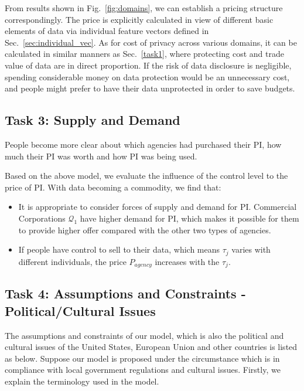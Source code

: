 \documentclass{mcmthesis}
\begin{document}
From results shown in Fig.~\ref{fig:domains}, we can establish a pricing structure correspondingly. The price is explicitly calculated in view of different basic elements of data via individual feature vectors defined in Sec.~\ref{sec:individual_vec}. As for cost of privacy across various domains, it can be calculated in similar manners as Sec.~\ref{task1}, where protecting cost and trade value of data are in direct proportion. If the risk of data disclosure is negligible, spending considerable money on data protection would be an unnecessary cost, and people might prefer to have their data unprotected in order to save budgets.

\subsection{Task 3: Supply and Demand}
\label{sec:task3}

People become more clear about which agencies had purchased their PI, how much their PI was worth and how PI was being used. 

Based on the above model, we evaluate the influence of the control level to the price of PI. With data becoming a commodity, we find that:
\begin{itemize}
\item It is appropriate to consider forces of supply and demand for PI. Commercial Corporations $\mathcal{Q}_1$ have higher demand for PI, which makes it possible for them to provide higher offer compared with the other two types of agencies.
\item If people have control to sell to their data, which means $\tau_j$ varies with different individuals, the price $P_{agency}$ increases with the $\tau_j$. 
\end{itemize}  

\subsection{Task 4: Assumptions and Constraints - Political/Cultural Issues}\label{sec:task4}
The assumptions and constraints of our model, which is also the political and cultural issues of the United States, European Union and other countries is listed as below. Suppose our model is proposed under the circumstance which is in compliance with local government regulations and cultural issues. Firstly, we explain the terminology used in the model.
\end{document}
